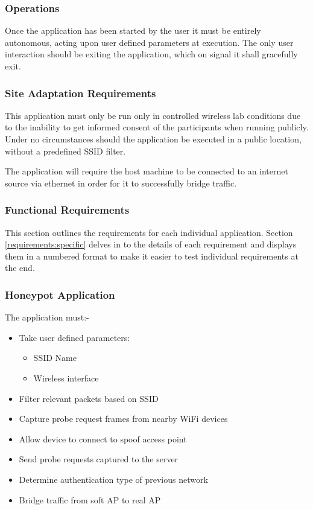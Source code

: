 \subsubsection{Operations}
Once the application has been started by the user it must be entirely autonomous, acting upon user defined parameters at execution. The only user interaction should be exiting the application, which on signal it shall gracefully exit.

\subsubsection{Site Adaptation Requirements}
This application must only be run only in controlled wireless lab conditions due to the inability to get informed consent of the participants when running publicly. Under no circumstances should the application be executed in a public location, without a predefined SSID filter.

The application will require the host machine to be connected to an internet source via ethernet in order for it to successfully bridge traffic.

\newpage
\subsubsection{Functional Requirements}
This section outlines the requirements for each individual application. Section \ref{requirements:specific} delves in to the details of each requirement and displays them in a numbered format to make it easier to test individual requirements at the end.

\subsubsection*{Honeypot Application}
The application must:-
\begin{itemize}
	\item Take user defined parameters:
		\begin{itemize}
			\item SSID Name
			\item Wireless interface
		\end{itemize}
	\item Filter relevant packets based on SSID
	\item Capture probe request frames from nearby WiFi devices
	\item Allow device to connect to spoof access point
	\item Send probe requests captured to the server
	\item Determine authentication type of previous network
	\item Bridge traffic from soft AP to real AP
\end{itemize}

